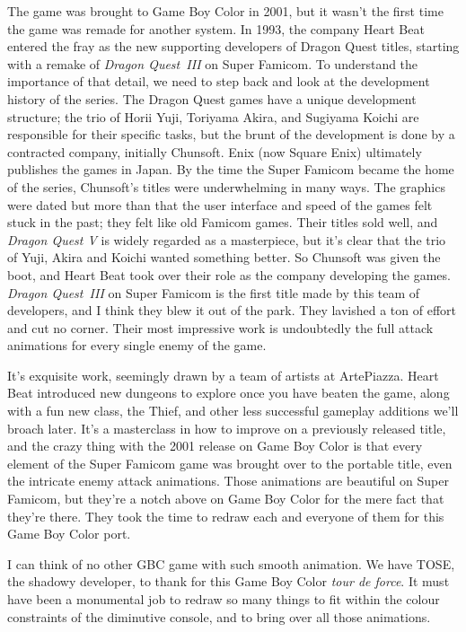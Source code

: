 \documentclass{book}
\begin{document}
The game was brought to Game Boy Color in 2001, but it wasn’t the first time the game was remade for another system. In 1993, the company Heart Beat entered the fray as the new supporting developers of Dragon Quest titles, starting with a remake of \emph{Dragon Quest III} on Super Famicom. To understand the importance of that detail, we need to step back and look at the development history of the series. The Dragon Quest games have a unique development structure; the trio of Horii Yuji, Toriyama Akira, and Sugiyama Koichi are responsible for their specific tasks, but the brunt of the development is done by a contracted company, initially Chunsoft. Enix (now Square Enix) ultimately publishes the games in Japan. By the time the Super Famicom became the home of the series, Chunsoft’s titles were underwhelming in many ways. The graphics were dated but more than that the user interface and speed of the games felt stuck in the past; they felt like old Famicom games. Their titles sold well, and \emph{Dragon Quest V} is widely regarded as a masterpiece, but it’s clear that the trio of Yuji, Akira and Koichi wanted something better. So Chunsoft was given the boot, and Heart Beat took over their role as the company developing the games. \emph{Dragon Quest III} on Super Famicom is the first title made by this team of developers, and I think they blew it out of the park. They lavished a ton of effort and cut no corner. Their most impressive work is undoubtedly the full attack animations for every single enemy of the game.

It’s exquisite work, seemingly drawn by a team of artists at ArtePiazza. Heart Beat introduced new dungeons to explore once you have beaten the game, along with a fun new class, the Thief, and other less successful gameplay additions we’ll broach later. It’s a masterclass in how to improve on a previously released title, and the crazy thing with the 2001 release on Game Boy Color is that every element of the Super Famicom game was brought over to the portable title, even the intricate enemy attack animations. Those animations are beautiful on Super Famicom, but they’re a notch above on Game Boy Color for the mere fact that they’re there. They took the time to redraw each and everyone of them for this Game Boy Color port.

I can think of no other GBC game with such smooth animation. We have TOSE, the shadowy developer, to thank for this Game Boy Color \emph{tour de force}. It must have been a monumental job to redraw so many things to fit within the colour constraints of the diminutive console, and to bring over all those animations.
\end{document}
